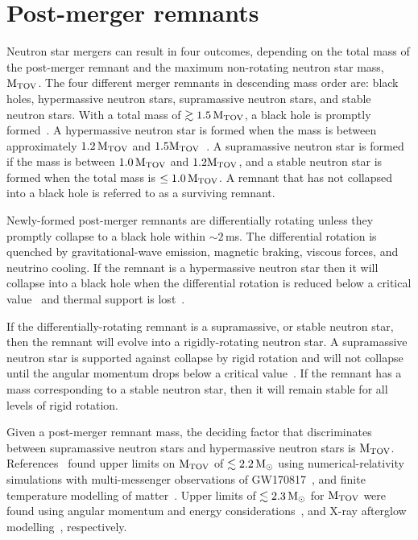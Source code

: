 \documentclass[../Thesis.tex]{subfiles}
\begin{document}
    \section{Post-merger remnants} \label{sec:Intro:PMR}


    Neutron star mergers can result in four outcomes, depending on the total mass of the post-merger remnant and the maximum non-rotating neutron star mass, $\mathrm{M_{TOV}}$.
    The four different merger remnants in descending mass order are: black holes, hypermassive neutron stars, supramassive neutron stars, and stable neutron stars.
    With a total mass of $\gtrsim 1.5\,\mathrm{M_{TOV}}$, a black hole is promptly formed~\cite{Weih2018}.
    A hypermassive neutron star is formed when the mass is between approximately $1.2\,\mathrm{M_{TOV}}$ and $1.5\mathrm{M_{TOV}}$~\cite{Breu2016,Weih2018}.
    A supramassive neutron star is formed if the mass is between $1.0\,\mathrm{M_{TOV}}$ and $1.2\mathrm{M_{TOV}}$, and a stable neutron star is formed when the total mass is $\leq 1.0\,\mathrm{M_{TOV}}$.
    A remnant that has not collapsed into a black hole is referred to as a surviving remnant.\par
    
    Newly-formed post-merger remnants are differentially rotating unless they promptly collapse to a black hole within $\sim 2\,$ms.
    The differential rotation is quenched by gravitational-wave emission, magnetic braking, viscous forces, and neutrino cooling.
    If the remnant is a hypermassive neutron star then it will collapse into a black hole when the differential rotation is reduced below a critical value~\cite{Weih2018} and thermal support is lost~\cite[e.g.,][]{Bauswein2010,Kaplan2014}.  \par
    
    If the differentially-rotating remnant is a supramassive, or stable neutron star, then the remnant will evolve into a rigidly-rotating neutron star.
    A supramassive neutron star is supported against collapse by rigid rotation and will not collapse until the angular momentum drops below a critical value~\cite{Breu2016}.
    If the remnant has a mass corresponding to a stable neutron star, then it will remain stable for all levels of rigid rotation.\par
    
    Given a post-merger remnant mass, the deciding factor that discriminates between supramassive neutron stars and hypermassive neutron stars is $\mathrm{M_{TOV}}$.
    References~\cite{Margalit2017,Rezzolla2018,Khadkikar2021} found upper limits on $\mathrm{M_{TOV}}$ of $\lesssim 2.2\,\mathrm{M}_{\odot}$ using numerical-relativity simulations with multi-messenger observations of GW170817~\cite{Margalit2017,Rezzolla2018}, and finite temperature modelling of matter~\cite{Khadkikar2021}. 
    Upper limits of $\lesssim 2.3\,\mathrm{M}_{\odot}$ for $\mathrm{M_{TOV}}$ were found using angular momentum and energy considerations~\cite{Shibata2019}, and X-ray afterglow modelling~\cite{Sarin2020}, respectively. \par
\end{document}
